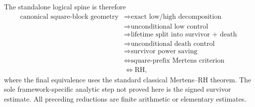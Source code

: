 The standalone logical spine is therefore
\[
 \begin{aligned}
 \text{canonical square-block geometry}
 &\Longrightarrow \text{exact low/high decomposition}\\
 &\Longrightarrow \text{unconditional low control}\\
 &\Longrightarrow \text{lifetime split into survivor + death}\\
 &\Longrightarrow \text{unconditional death control}\\
 &\Longrightarrow \text{survivor power saving}\\
 &\Longleftrightarrow \text{square-prefix Mertens criterion}\\
 &\Longleftrightarrow \mathrm{RH},
 \end{aligned}
\]
where the final equivalence uses the standard classical Mertens--RH theorem.  The sole framework-specific analytic step not proved here is the signed survivor estimate.  All preceding reductions are finite arithmetic or elementary estimates.
